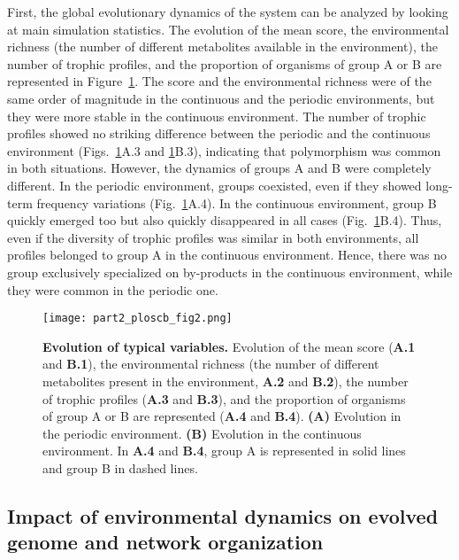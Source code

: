 First, the global evolutionary dynamics of the system can be analyzed by looking at main simulation statistics. The evolution of the mean score, the environmental richness (the number of different metabolites available in the environment), the number of trophic profiles, and the proportion of organisms of group A or B are represented in Figure~\ref{fig:part2:first_result:Fig2}. The score and the environmental richness were of the same order of magnitude in the continuous and the periodic environments, but they were more stable in the continuous environment. The number of trophic profiles showed no striking difference between the periodic and the continuous environment (Figs.~\ref{fig:part2:first_result:Fig2}A.3 and \ref{fig:part2:first_result:Fig2}B.3), indicating that polymorphism was common in both situations. However, the dynamics of groups A and B were completely different. In the periodic environment, groups coexisted, even if they showed long-term frequency variations (Fig.~\ref{fig:part2:first_result:Fig2}A.4). In the continuous environment, group B quickly emerged too but also quickly disappeared in all cases (Fig.~\ref{fig:part2:first_result:Fig2}B.4). Thus, even if the diversity of trophic profiles was similar in both environments, all profiles belonged to group A in the continuous environment. Hence, there was no group exclusively specialized on by-products in the continuous environment, while they were common in the periodic one.

\begin{figure}[!h]
\centering
\texttt{[image: part2\_ploscb\_fig2.png]}
\caption[Evolution of typical variables.]{{\bf Evolution of typical variables.} Evolution of the mean score ({\bf A.1} and {\bf B.1}), the environmental richness (the number of different metabolites present in the environment, {\bf A.2} and {\bf B.2}), the number of trophic profiles ({\bf A.3} and {\bf B.3}), and the proportion of organisms of group A or B are represented ({\bf A.4} and {\bf B.4}). {\bf (A)} Evolution in the periodic environment. {\bf (B)} Evolution in the continuous environment. In {\bf A.4} and {\bf B.4}, group A is represented in solid lines and group B in dashed lines.}
\label{fig:part2:first_result:Fig2}
\end{figure}


\subsection*{Impact of environmental dynamics on evolved genome and network organization}

